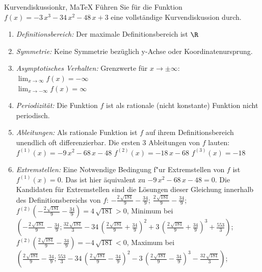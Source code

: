  \providecommand{\MoIl}{(} 
 \providecommand{\MoIr}{)}
 \providecommand{\MIntvlSep}{;} 
 \providecommand{\MElSetSep}{;} 
 \begin{MAufgabe}{Kurvendiskussion}{kr, MaTeX}
 F\"uhren Sie f\"ur die Funktion $f(x)= - 3\, x^3 - 34\, x^2 - 48\, x + 3$ eine vollst\"andige Kurvendiskussion durch.\\ 
 \ifLsg\Loesung
 \begin{enumerate}
 \item \emph{Definitionsbereich:} 
 Der maximale Definitionsbereich ist $\R$\item \emph{Symmetrie:} 
 Keine Symmetrie bez\"uglich y-Achse oder Koordinatenursprung.\item \emph{Asymptotisches Verhalten:} 
 Grenzwerte f\"ur $x\rightarrow \pm \infty$: \\ 
 $\lim_{x\rightarrow \infty} f(x)=- \infty$ \\ 
 $\lim_{x\rightarrow -\infty} f(x)=\infty$ \\ 
 \item \emph{Periodizit\"at:} 
 Die Funktion $f$ ist als rationale (nicht konstante) Funktion nicht periodisch.\item \emph{Ableitungen:} 
 Als rationale Funktion ist $f$ auf ihrem Definitionsbereich unendlich oft differenzierbar. 
 Die ersten 3 Ableitungen von $f$ lauten: \\ 
 $f^{(1)}(x)= - 9\, x^2 - 68\, x - 48$\newline 
  $f^{(2)}(x)= - 18\, x - 68$\newline 
  $f^{(3)}(x)=-18$\newline 
  \item \emph{Extremstellen:} 
 Eine Notwendige Bedingung f"ur Extremstellen von $f$ ist $f^{(1)}(x)=0$. 
 Das ist hier \"aquivalent zu $ - 9\, x^2 - 68\, x - 48=0$. 
 Die Kandidaten f\"ur Extremstellen sind die L\"osungen dieser Gleichung innerhalb des Definitionsbereichs von $f$: $ - \frac{2\, \sqrt{181}}{9} - \frac{34}{9}$; $\frac{2\, \sqrt{181}}{9} - \frac{34}{9}$; \\ 
 $f^{(2)}( - \frac{2\, \sqrt{181}}{9} - \frac{34}{9})=4\, \sqrt{181}$$>0$, Minimum bei $( - \frac{2\, \sqrt{181}}{9} - \frac{34}{9};\frac{32\, \sqrt{181}}{3} - 34\, {\left(\frac{2\, \sqrt{181}}{9} + \frac{34}{9}\right)}^2 + 3\, {\left(\frac{2\, \sqrt{181}}{9} + \frac{34}{9}\right)}^3 + \frac{553}{3})$; \\ 
 $f^{(2)}(\frac{2\, \sqrt{181}}{9} - \frac{34}{9})=- 4\, \sqrt{181}$$<0$, Maximum bei $(\frac{2\, \sqrt{181}}{9} - \frac{34}{9};\frac{553}{3} - 34\, {\left(\frac{2\, \sqrt{181}}{9} - \frac{34}{9}\right)}^2 - 3\, {\left(\frac{2\, \sqrt{181}}{9} - \frac{34}{9}\right)}^3 - \frac{32\, \sqrt{181}}{3})$; \\ 

\end{enumerate}
\end{MAufgabe}
